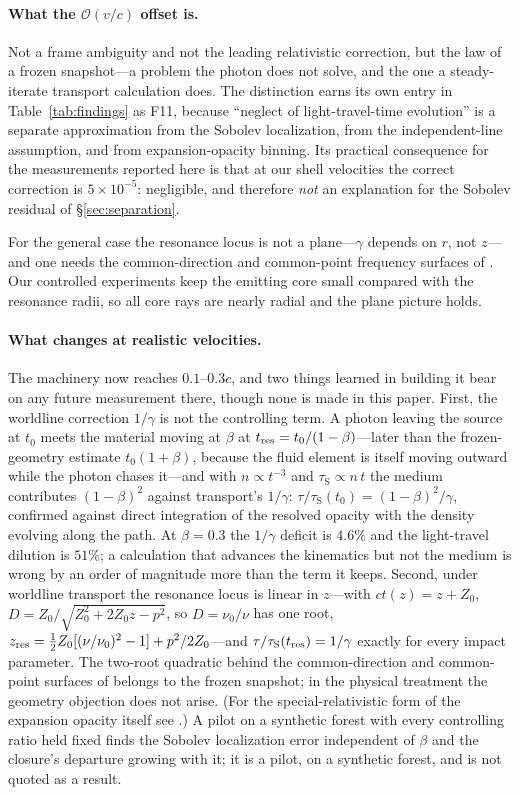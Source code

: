 \documentclass[fleqn,usenatbib]{mnras}
\newcommand{\taus}{\tau_{\mathrm{S}}}
\begin{document}
\paragraph{What the $\mathcal{O}(v/c)$ offset is.} Not a frame ambiguity and
not the leading relativistic correction, but the law of a frozen
snapshot---a problem the photon does not solve, and the one a steady-iterate
transport calculation does. The distinction earns its own entry in Table~\ref{tab:findings} as F11,
because ``neglect of light-travel-time evolution'' is a separate approximation
from the Sobolev localization, from the independent-line assumption, and from
expansion-opacity binning. Its practical consequence for the measurements
reported here is that at our shell velocities the correct correction is
$5\times10^{-5}$: negligible, and therefore \emph{not} an explanation for the
Sobolev residual of \S\ref{sec:separation}.

For the general case the resonance locus is not a plane---$\gamma$ depends on
$r$, not $z$---and one needs the common-direction and common-point frequency
surfaces of \citet{jeffery1993}. Our controlled experiments keep the emitting
core small compared with the resonance radii, so all core rays are nearly
radial and the plane picture holds.

\paragraph{What changes at realistic velocities.} The machinery now reaches
$0.1$--$0.3c$, and two things learned in building it bear on any future
measurement there, though none is made in this paper. First, the worldline
correction $1/\gamma$ is not the controlling term. A photon leaving the
source at $t_0$ meets the material moving at $\beta$ at
$t_{\rm res}=t_0/(1-\beta)$---later than the frozen-geometry estimate
$t_0(1+\beta)$, because the fluid element is itself moving outward while the
photon chases it---and with $n\propto t^{-3}$ and $\taus\propto n\,t$ the medium
contributes $(1-\beta)^2$ against transport's $1/\gamma$:
$\tau/\taus(t_0) = (1-\beta)^2/\gamma$, confirmed against direct integration of
the resolved opacity with the density evolving along the path. At
$\beta=0.3$ the $1/\gamma$ deficit is $4.6\%$ and the light-travel dilution is
$51\%$; a calculation that advances the kinematics but not the medium is
wrong by an order of magnitude more than the term it keeps. Second, under
worldline transport the resonance locus is linear in $z$---with $ct(z)=z+Z_0$,
$D=Z_0/\sqrt{Z_0^2+2Z_0z-p^2}$, so $D=\nu_0/\nu$ has one root,
$z_{\rm res}=\tfrac12 Z_0[(\nu/\nu_0)^2-1]+p^2/2Z_0$---and
$\tau/\taus(t_{\rm res})=1/\gamma$ exactly for every impact parameter. The
two-root quadratic behind the common-direction and common-point surfaces of
\citet{jeffery1993} belongs to the frozen snapshot; in the physical treatment
the geometry objection does not arise. (For the special-relativistic form of
the expansion opacity itself see \citealt{li2019}.) A pilot on a synthetic
forest with every controlling ratio held fixed finds the Sobolev
localization error independent of $\beta$ and the closure's departure growing
with it; it is a pilot, on a synthetic forest, and is not quoted as a result.
\end{document}
